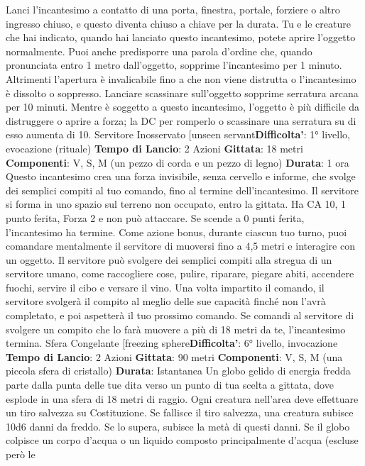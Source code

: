 \begin{multicols}{2}
Lanci l’incantesimo a contatto di una porta, finestra,
portale, forziere o altro ingresso chiuso, e questo
diventa chiuso a chiave per la durata. Tu e le creature
che hai indicato, quando hai lanciato questo
incantesimo, potete aprire l’oggetto normalmente. Puoi
anche predisporre una parola d’ordine che, quando
pronunciata entro 1 metro dall’oggetto, sopprime
l’incantesimo per 1 minuto. Altrimenti l’apertura è
invalicabile fino a che non viene distrutta o
l’incantesimo è dissolto o soppresso. Lanciare
scassinare sull’oggetto sopprime serratura arcana per
10 minuti.
Mentre è soggetto a questo incantesimo, l’oggetto è più
difficile da distruggere o aprire a forza; la DC per
romperlo o scassinare una serratura su di esso
aumenta di 10.
Servitore Inosservato
[unseen servant\textbf{Difficolta'}:
1° livello, evocazione (rituale)
\textbf{Tempo di Lancio}: 2 Azioni
\textbf{Gittata}: 18 metri
\textbf{Componenti}: V, S, M (un pezzo di corda e un pezzo di
legno)
\textbf{Durata}: 1 ora
Questo incantesimo crea una forza invisibile, senza
cervello e informe, che svolge dei semplici compiti al
tuo comando, fino al termine dell’incantesimo. Il
servitore si forma in uno spazio sul terreno non
occupato, entro la gittata. Ha CA 10, 1 punto ferita,
Forza 2 e non può attaccare. Se scende a 0 punti ferita,
l’incantesimo ha termine.
Come azione bonus, durante ciascun tuo turno, puoi
comandare mentalmente il servitore di muoversi fino a
4,5 metri e interagire con un oggetto. Il servitore può
svolgere dei semplici compiti alla stregua di un servitore
umano, come raccogliere cose, pulire, riparare, piegare
abiti, accendere fuochi, servire il cibo e versare il vino.
Una volta impartito il comando, il servitore svolgerà il
compito al meglio delle sue capacità finché non l’avrà
completato, e poi aspetterà il tuo prossimo comando.
Se comandi al servitore di svolgere un compito che lo
farà muovere a più di 18 metri da te, l’incantesimo
termina.
Sfera Congelante
[freezing sphere\textbf{Difficolta'}:
6° livello, invocazione
\textbf{Tempo di Lancio}: 2 Azioni
\textbf{Gittata}: 90 metri
\textbf{Componenti}: V, S, M (una piccola sfera di cristallo)
\textbf{Durata}: Istantanea
Un globo gelido di energia fredda parte dalla punta
delle tue dita verso un punto di tua scelta a gittata, dove
esplode in una sfera di 18 metri di raggio. Ogni creatura
nell’area deve effettuare un tiro salvezza su
Costituzione. Se fallisce il tiro salvezza, una creatura
subisce 10d6 danni da freddo. Se lo supera, subisce la
metà di questi danni.
Se il globo colpisce un corpo d’acqua o un liquido
composto principalmente d’acqua (escluse però le

\end{multicols}
